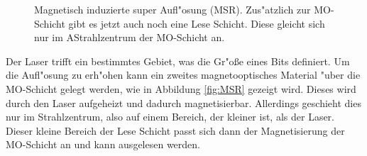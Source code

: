 \begin{figure}[htbp]
\begin{minipage}[t][][b]{0.48\textwidth}
    \end{minipage}
    \hfill
    \begin{minipage}[t][][t]{0.45\textwidth}
        \caption{
            Magnetisch induzierte super Aufl"osung (MSR).
            Zus"atzlich zur MO-Schicht gibt es jetzt auch noch eine Lese Schicht.
            Diese gleicht sich nur im AStrahlzentrum der MO-Schicht an.
        }
        \label{fig:MSR}
    \end{minipage}
\end{figure}

Der Laser trifft ein bestimmtes Gebiet, was die Gr"o{\ss}e eines Bits definiert.
Um die Aufl"osung zu erh"ohen kann ein zweites magnetooptisches Material "uber die MO-Schicht gelegt werden, wie in Abbildung \vref{fig:MSR} gezeigt wird.
Dieses wird durch den Laser aufgeheizt und dadurch magnetisierbar.
Allerdings geschieht dies nur im Strahlzentrum, also auf einem Bereich, der kleiner ist, als der Laser.
Dieser kleine Bereich der Lese Schicht passt sich dann der Magnetisierung der MO-Schicht an und kann ausgelesen werden.
\cite{roll}


